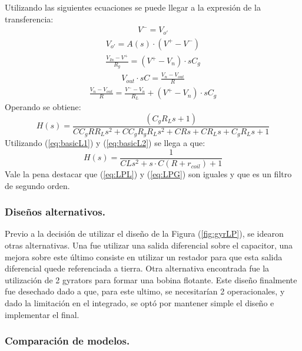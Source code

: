 Utilizando las siguientes ecuaciones se puede llegar a la expresión de la transferencia:
\begin{align}V^- = V_{o'}\end{align}
\begin{align}V_{o'} = A(s)\cdot (V^+-V^-)\end{align}
\begin{align}\frac{V_{In}-V^+}{R_g}=(V^+-V_n)\cdot s C_g\end{align}
\begin{align}V_{out}\cdot s C=\frac{V_{n}-V_{out}}{R}\end{align}
\begin{align}\frac{V_{n}-V_{out}}{R}=\frac{V^--V_n}{R_L} +(V^+-V_n)\cdot s C_g\end{align}
Operando se obtiene:
\begin{equation} H(s)= \frac{\left(C_g R_L s + 1\right)}{C C_g R R_L s^{2} + C C_g R_g R_L s^{2} + C R s + C R_L s + C_g R_L s + 1}
\end{equation}
Utilizando (\ref{eq:basicL1}) y (\ref{eq:basicL2}) se llega a que:
\begin{equation} H(s)= \frac{1}{C L s^{2} + s\cdot C (R+r_{coil}) + 1}
\label{eq:LPG}
\end{equation}
Vale la pena destacar que (\ref{eq:LPL}) y (\ref{eq:LPG}) son iguales y que es un filtro de segundo orden.
\subsubsection{Diseños alternativos.}

Previo a la decisión de utilizar el diseño de la Figura (\ref{fig:gyrLP}), se idearon otras alternativas. Una fue utilizar una salida diferencial sobre el capacitor, una mejora sobre este último consiste en utilizar un restador para que esta salida diferencial quede referenciada a tierra. Otra alternativa encontrada fue la utilización de 2 gyrators para formar una bobina flotante. Este diseño finalmente fue desechado dado a que, para este ultimo, se necesitarían 2 operacionales, y dado la limitación en el integrado, se optó por mantener simple el diseño e implementar el final.
\subsubsection{Comparación de modelos.}

